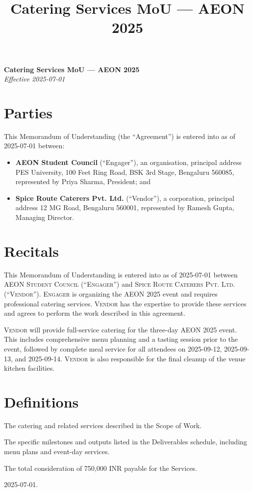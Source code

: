 \documentclass[11pt,letterpaper]{article}
\title{Catering Services MoU — AEON 2025}
\date{}
\begin{document}
\begin{center}
{\Large\bfseries Catering Services MoU — AEON 2025}\\[0.6em]
\textit{Effective 2025-07-01}
\end{center}



\section*{Parties}
This Memorandum of Understanding (the ``Agreement'') is entered into as of 2025-07-01 between:
\begin{itemize}[leftmargin=1.2em]
\item \textbf{AEON Student Council} (``Engager''), an organisation, principal address PES University, 100 Feet Ring Road, BSK 3rd Stage, Bengaluru 560085, represented by Priya Sharma, President; and
\item \textbf{Spice Route Caterers Pvt. Ltd.} (``Vendor''), a corporation, principal address 12 MG Road, Bengaluru 560001, represented by Ramesh Gupta, Managing Director.
\end{itemize}

\section*{Recitals}
This Memorandum of Understanding is entered into as of 2025-07-01 between \textsc{AEON Student Council} (``\textsc{Engager}'') and \textsc{Spice Route Caterers Pvt. Ltd.} (``\textsc{Vendor}''). \textsc{Engager} is organizing the AEON 2025 event and requires professional catering services. \textsc{Vendor} has the expertise to provide these services and agrees to perform the work described in this agreement.

\textsc{Vendor} will provide full-service catering for the three-day AEON 2025 event. This includes comprehensive menu planning and a tasting session prior to the event, followed by complete meal service for all attendees on 2025-09-12, 2025-09-13, and 2025-09-14. \textsc{Vendor} is also responsible for the final cleanup of the venue kitchen facilities.

\section*{Definitions}
\begin{description}[leftmargin=1.5em,style=nextline]
  \item[\textsc{Services}] The catering and related services described in the Scope of Work.
  \item[\textsc{Deliverables}] The specific milestones and outputs listed in the Deliverables schedule, including menu plans and event-day services.
  \item[\textsc{Total Fee}] The total consideration of 750,000 INR payable for the Services.
  \item[\textsc{Effective Date}] 2025-07-01.
\end{description}
\end{document}
